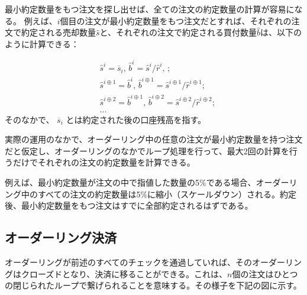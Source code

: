 \documentclass{article}
\makeatletter
\newenvironment{figurehere}
 {\def\@captype{figure}}
 {}
\makeatother
\begin{document}
\begin{multicols}{2}
最小約定数量をもつ注文を探し出せば、全ての注文の約定数量の計算が容易になる。
例えば、$i$個目の注文が最小約定数量をもつ注文だとすれば、それぞれの注文で約定される売却数量$\hat{s}$と、それぞれの注文で約定される買付数量$\hat{b}$は、以下のように計算できる：

\[
\begin{split}
&\hat{s}^{i}=\overline{s}_i\text{, } \hat{b}^{i}=\hat{s}^{i}/ \hat{r}^i\text{, }\text{;}\\
&\hat{s}^{i\oplus 1}=\hat{b}^i\text{, } \hat{b}^{i\oplus 1}=\hat{s}^{i\oplus 1}/ \hat{r}^{i\oplus 1}\text{;}\\
&\hat{s}^{i\oplus 2}=\hat{b}^{i\oplus 1}\text{, } \hat{b}^{i\oplus 2}=\hat{s}^{i\oplus 2}/ \hat{r}^{i\oplus 2}\text{;}\\
& ...
\end{split}
\]
そのなかで、 $\overline{s}_i$ とは約定された後の口座残高を指す。

実際の運用のなかで、オーダーリング中の任意の注文が最小約定数量を持つ注文だと仮定し、オーダーリングのなかでループ処理を行って、最大2回の計算を行うだけでそれぞれの注文の約定数量を計算できる。

例えば、最小約定数量が注文の中で指値した数量の5\%である場合、オーダーリング中のすべての注文の約定数量は5\%に縮小（スケールダウン）される。約定後、最小約定数量をもつ注文はすでに全部約定されるはずである。

\subsection{オーダーリング決済\label{sec:settlement}}

オーダーリングが前述のすべてのチェックを通過していれば、そのオーダーリングはクローズドとなり、決済に移ることができる。これは、$n$個の注文はひとつの閉じられたループで繋げられることを意味する。その様子を下記の図に示す。

\begin{center}
\begin{figurehere}
\centering
{}
\end{figurehere}
\end{center}
\end{multicols}
\end{document}
